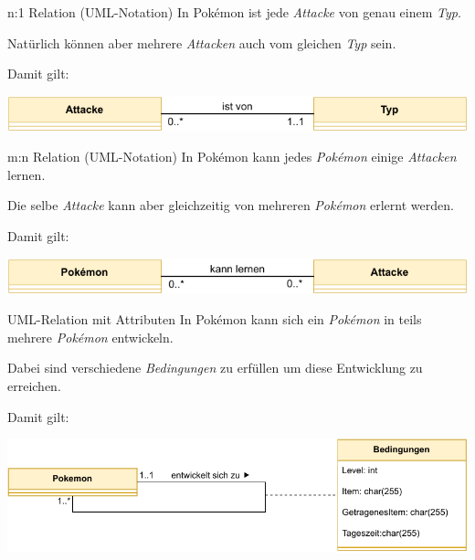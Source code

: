 \begin{example}{n:1 Relation (UML-Notation)}
    In Pokémon ist jede \emph{Attacke} von genau einem \emph{Typ}.

    Natürlich können aber mehrere \emph{Attacken} auch vom gleichen \emph{Typ} sein.

    Damit gilt:
    \begin{center}
        \includegraphics[width=0.7\linewidth]{includes/figures/example_entity_relationship_modell_uml_many_to_one.pdf}
    \end{center}
\end{example}

\begin{example}{m:n Relation (UML-Notation)}
    In Pokémon kann jedes \emph{Pokémon} einige \emph{Attacken} lernen.

    Die selbe \emph{Attacke} kann aber gleichzeitig von mehreren \emph{Pokémon} erlernt werden.

    Damit gilt:
    \begin{center}
        \includegraphics[width=0.7\linewidth]{includes/figures/example_entity_relationship_modell_uml_many_to_many.pdf}
    \end{center}
\end{example}

\begin{example}{UML-Relation mit Attributen}
    In Pokémon kann sich ein \emph{Pokémon} in teils mehrere \emph{Pokémon} entwickeln.

    Dabei sind verschiedene \emph{Bedingungen} zu erfüllen um diese Entwicklung zu erreichen.

    Damit gilt:
    \begin{center}
        \includegraphics[width=0.7\linewidth]{includes/figures/example_uml_relation_associated.pdf}
    \end{center}
\end{example}

